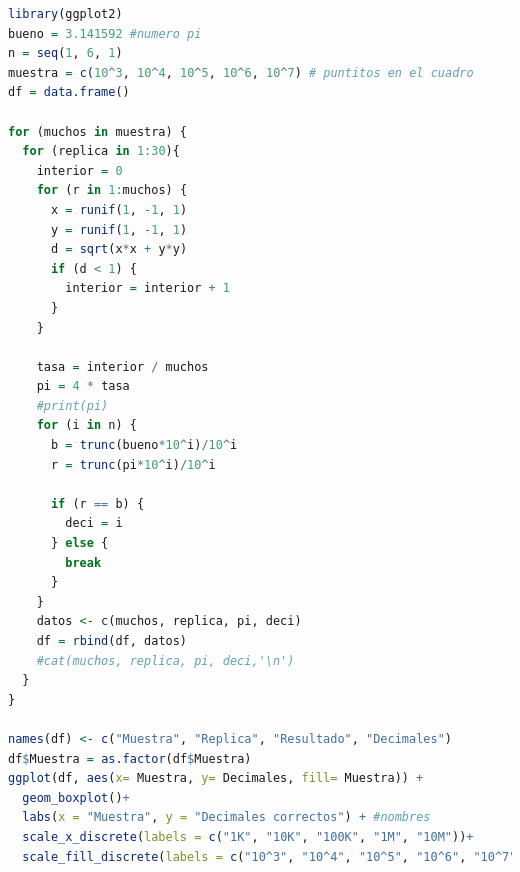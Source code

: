 \documentclass{article}
\begin{document}
\lstset{style=mystyle}
\begin{lstlisting}[language=R, caption= Código para obtener la cantidad de decimales que coinciden al comparar el valor de $\pi$ calculado con el método Monte Carlo y el valor real de $\pi$ considerado como $3.141592$.]
library(ggplot2)
bueno = 3.141592 #numero pi
n = seq(1, 6, 1)
muestra = c(10^3, 10^4, 10^5, 10^6, 10^7) # puntitos en el cuadro
df = data.frame()

for (muchos in muestra) {
  for (replica in 1:30){
    interior = 0
    for (r in 1:muchos) {
      x = runif(1, -1, 1)
      y = runif(1, -1, 1)
      d = sqrt(x*x + y*y)
      if (d < 1) {
        interior = interior + 1
      }
    }
    
    tasa = interior / muchos
    pi = 4 * tasa
    #print(pi)
    for (i in n) {
      b = trunc(bueno*10^i)/10^i
      r = trunc(pi*10^i)/10^i
      
      if (r == b) {
        deci = i
      } else {
        break
      }
    }
    datos <- c(muchos, replica, pi, deci)
    df = rbind(df, datos)
    #cat(muchos, replica, pi, deci,'\n')
  }
}

names(df) <- c("Muestra", "Replica", "Resultado", "Decimales")
df$Muestra = as.factor(df$Muestra)
ggplot(df, aes(x= Muestra, y= Decimales, fill= Muestra)) + 
  geom_boxplot()+
  labs(x = "Muestra", y = "Decimales correctos") + #nombres
  scale_x_discrete(labels = c("1K", "10K", "100K", "1M", "10M"))+
  scale_fill_discrete(labels = c("10^3", "10^4", "10^5", "10^6", "10^7"))
\end{lstlisting}
\end{document}
